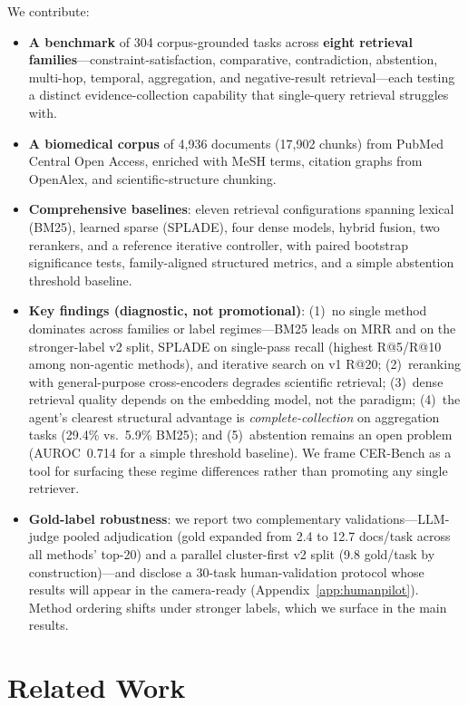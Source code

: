 \documentclass{article}
\begin{document}
We contribute:
\begin{itemize}[leftmargin=*,itemsep=2pt,topsep=2pt]
\item \textbf{A benchmark} of 304 corpus-grounded tasks across \textbf{eight retrieval families}---constraint-satisfaction, comparative, contradiction, abstention, multi-hop, temporal, aggregation, and negative-result retrieval---each testing a distinct evidence-collection capability that single-query retrieval struggles with.
\item \textbf{A biomedical corpus} of 4,936 documents (17,902 chunks) from PubMed Central Open Access, enriched with MeSH terms, citation graphs from OpenAlex, and scientific-structure chunking.
\item \textbf{Comprehensive baselines}: eleven retrieval configurations spanning lexical (BM25), learned sparse (SPLADE), four dense models, hybrid fusion, two rerankers, and a reference iterative controller, with paired bootstrap significance tests, family-aligned structured metrics, and a simple abstention threshold baseline.
\item \textbf{Key findings (diagnostic, not promotional)}: (1)~no single method dominates across families or label regimes---BM25 leads on MRR and on the stronger-label v2 split, SPLADE on single-pass recall (highest R@5/R@10 among non-agentic methods), and iterative search on v1 R@20; (2)~reranking with general-purpose cross-encoders degrades scientific retrieval; (3)~dense retrieval quality depends on the embedding model, not the paradigm; (4)~the agent's clearest structural advantage is \emph{complete-collection} on aggregation tasks (29.4\% vs.\ 5.9\% BM25); and (5)~abstention remains an open problem (AUROC~0.714 for a simple threshold baseline). We frame CER-Bench as a tool for surfacing these regime differences rather than promoting any single retriever.
\item \textbf{Gold-label robustness}: we report two complementary validations---LLM-judge pooled adjudication (gold expanded from 2.4 to 12.7 docs/task across all methods' top-20) and a parallel cluster-first v2 split (9.8 gold/task by construction)---and disclose a 30-task human-validation protocol whose results will appear in the camera-ready (Appendix~\ref{app:humanpilot}). Method ordering shifts under stronger labels, which we surface in the main results.
\end{itemize}

\section{Related Work}
\label{sec:related}
\end{document}

